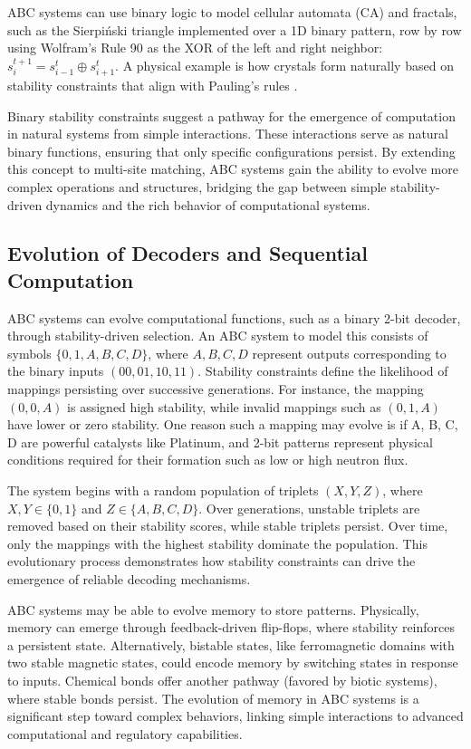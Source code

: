 \documentclass[entropy,article,submit,pdftex,moreauthors]{Definitions/mdpi}
\begin{document}
ABC systems can use binary logic to model cellular automata (CA) and fractals, such as the Sierpiński triangle implemented over a 1D binary pattern, row by row using Wolfram's Rule 90 \cite{wolfram1983statistical} as the XOR of the left and right neighbor: \( s_{i}^{t+1} = s_{i-1}^t \oplus s_{i+1}^t \). A physical example is how crystals form naturally based on stability constraints that align with Pauling's rules \cite{pauling1960nature}. 

Binary stability constraints suggest a pathway for the emergence of computation in natural systems from simple interactions. These interactions serve as natural binary functions, ensuring that only specific configurations persist. By extending this concept to multi-site matching, ABC systems gain the ability to evolve more complex operations and structures, bridging the gap between simple stability-driven dynamics and the rich behavior of computational systems.

\subsection{Evolution of Decoders and Sequential Computation}

ABC systems can evolve computational functions, such as a binary 2-bit decoder, through stability-driven
selection. An ABC system to model this consists of symbols \(\{0, 1, A, B, C, D\}\), where \(A, B, C, D\) represent outputs corresponding to the binary inputs \((00, 01, 10, 11)\). Stability constraints define the likelihood of mappings persisting over successive generations. For instance, the mapping \((0, 0, A)\) is assigned high stability, while invalid mappings such as \((0, 1, A)\) have lower or zero stability. One reason such a mapping may evolve is if A, B, C, D are powerful catalysts like Platinum, and 2-bit patterns represent physical conditions required for their formation such as low or high neutron flux.

The system begins with a random population of triplets \((X, Y, Z)\), where \(X, Y \in \{0, 1\}\) and \(Z \in \{A, B, C, D\}\). Over generations, unstable triplets are removed based on their stability scores, while stable triplets persist. Over time, only the mappings with the highest stability dominate the population. This evolutionary process demonstrates how stability constraints can drive the emergence of reliable decoding mechanisms.

ABC systems may be able to evolve memory to store patterns. Physically, memory can emerge through feedback-driven flip-flops, where stability reinforces a persistent state. Alternatively, bistable states, like ferromagnetic domains with two stable magnetic states, could encode memory by switching states in response to inputs. Chemical bonds offer another pathway (favored by biotic systems), where stable bonds persist. The evolution of memory in ABC systems is a significant step toward complex behaviors, linking simple interactions to advanced computational and regulatory capabilities.
\end{document}

